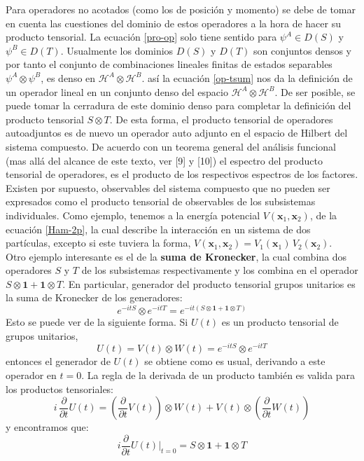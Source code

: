 \documentclass[12pt]{book}
\numberwithin{equation}{chapter}
\def\H{\mathcal{H}}
\def\pr{\otimes}
\def\x{\mathbf{x}}
\def\1{\mathbf{1}}
\begin{document}
Para operadores no acotados (como los de posici\'on y momento) se debe de tomar en cuenta las cuestiones del dominio de estos operadores a la hora de hacer su producto tensorial. La ecuaci\'on \eqref{pro-op} solo tiene sentido para $\psi^{A} \in D(S)$ y $ \psi^{B} \in D(T) $. Usualmente los dominios $D(S)$ y $D(T)$ son conjuntos densos y por tanto el conjunto de combinaciones lineales finitas de estados separables $\psi^{A} \pr \psi^{B}$, es denso en $\H^{A} \pr \H^{B}$. as\'i la ecuaci\'on \eqref{op-tsum} nos da la definici\'on de un operador lineal en un conjunto denso del espacio $\H^{A} \pr \H^{B}$. De ser posible, se puede tomar la cerradura de este dominio denso para completar la definici\'on del producto tensorial $S \pr T$. De esta forma, el producto tensorial de operadores autoadjuntos es de nuevo un operador auto adjunto en el espacio de Hilbert del sistema compuesto. De acuerdo con un teorema general del an\'alisis funcional (mas all\'a del alcance de este texto, ver [9] y [10]) el espectro del producto tensorial de operadores, es el producto de los respectivos espectros de los factores.\\

Existen por supuesto, observables del sistema compuesto que no pueden ser expresados como el producto tensorial de observables de los subsistemas individuales. Como ejemplo, tenemos a la energ\'ia potencial $V(\x_{1},\x_{2})$, de la ecuaci\'on \eqref{Ham-2p}, la cual describe la interacci\'on en un sistema de dos part\'iculas, excepto si este tuviera la forma, $V(\x_{1},\x_{2})=V_{1}(\x_{1})\, V_{2}(\x_{2}) $. \\
Otro ejemplo interesante es el de la {\bf suma de Kronecker}, la cual combina dos operadores $S$ y $T$ de los subsistemas respectivamente y los combina en el operador $ S \pr \1 + \1 \pr T $. En particular, generador del producto tensorial grupos unitarios es la suma de Kronecker de los generadores:
\begin{equation}
e^{-itS} \pr e^{-itT} = e^{ -it( S \pr \1 + \1 \pr T ) }
\end{equation}
Esto se puede ver de la siguiente forma. Si $U(t)$ es un producto tensorial de grupos unitarios, 
$$ U(t)= V(t) \pr W(t)  = e^{-itS} \pr e^{-itT}$$
entonces el generador de $U(t)$ se obtiene como es usual, derivando a este operador en $t=0$. La regla de la derivada de un producto tambi\'en es valida para los productos tensoriales:
$$ i\, \frac{\partial}{\partial t} U(t) = \left( \frac{\partial}{\partial t} V(t) \right) \pr W(t) + V(t) \pr \left( \frac{\partial}{\partial t}W(t) \right) $$
y encontramos que:
$$ i \frac{\partial}{\partial t} U(t) \Big|_{t=0} = S \pr \1 + \1 \pr T $$
\end{document}
